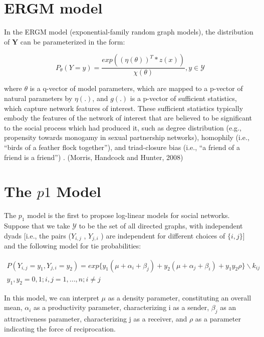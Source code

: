 \documentclass[12pt]{ociamthesis}  %
\begin{document}
	
	\section{ERGM model}
	In the ERGM model (exponential-family random graph models), the distribution of $\textbf{Y}$ can be parameterized in the form:
	
	\begin{equation}
	P_{\theta}(Y = y) = \frac{exp((\eta(\theta)) ^{T}*z(x))}{\chi(\theta)}, y \in \mathcal{Y}
	\end{equation}
	
	where $\theta$ is a q-vector of model parameters, which are mapped to a p-vector of natural parameters
	by $\eta(.)$, and $g(.)$ is a p-vector of sufficient statistics, which capture network features of interest. These sufficient statistics typically embody the
	features of the network of interest that are believed to be significant to the social
	process which had produced it, such as degree distribution (e.g., propensity
	towards monogamy in sexual partnership networks), homophily (i.e., “birds of
	a feather flock together”), and triad-closure bias (i.e., “a friend of a friend is a
	friend”) . (Morris, Handcock and Hunter, 2008)
	
	\section{The $p1$ Model}
	
	The $p_{1}$ model is the first to propose log-linear models for social
	networks. Suppose that we take $\mathcal{Y}$ to be the set of all directed graphs, with independent dyads [i.e., the pairs ($Y_{i,j}$ , $Y_{j,i}$ ) are independent for different choices of $\{i, j\}$] and the following model for tie probabilities:
	
	\begin{multline}
	P(Y_{i,j} = y_{1}, Y_{j,i} = y_{2}) = exp \{ y_{1}(\mu + \alpha_{i} + \beta_{j}) + y_{2}(\mu + \alpha_{j} + \beta_{i}) + y_{1}y_{2} \rho\} \backslash k_{ij} \\  y_{1}, y_{2} = 0,1 ; i,j = 1,...,n; i \neq j 
	\end{multline}
	
	In this model, we can interpret $\mu$ as a density parameter, constituting an overall mean, $\alpha_{i}$ as a productivity parameter, characterizing i as a sender, $\beta_{j}$ as an attractiveness parameter, characterizing j as a receiver, and $\rho$ as a parameter indicating the force of reciprocation.
	
\end{document}
